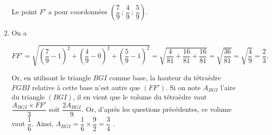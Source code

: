 \documentclass[11pt,fleqn, openany]{book} %
\begin{document}
\begin{solution}
\begin{enumerate}
\begin{enumerate}
Le point $F'$ a pour coordonnées $\left(\dfrac{7}{9} \, ;\, \dfrac{4}{9} \,;\, \dfrac{5}{9}\right)$.
\vskip5pt
\item On a

\[FF' = \sqrt{\left(\dfrac{7}{9}-1\right)^2+\left(\dfrac{4}{9}-0\right)^2 + \left(\dfrac{5}{9}-1\right)^2}=\sqrt{ \dfrac{4}{81}+\dfrac{16}{81}+\dfrac{16}{81}}=\sqrt{\dfrac{36}{81}}=\sqrt{\dfrac{4}{9}}=\dfrac{2}{3}.\]

Or, en utilisant le triangle $BGI$ comme base, la hauteur du tétraèdre $FGBI$ relative à cette base n'est autre que $(FF')$. Si on note $A_{BGI}$ l'aire du triangle $(BGI)$, il en vient que le volume du tétraèdre vaut $\dfrac{A_{BGI} \times FF'}{3}$ soit $\dfrac{2A_{BGI}}{9}$. Or, d'après les questions précédentes, ce volume vaut $\dfrac{1}{6}$. Ainsi, $A_{BGI}= \dfrac{1}{6} \times \dfrac{9}{2} = \dfrac{3}{4}$ .
\end{enumerate} \end{enumerate}\end{solution}
\end{document}
